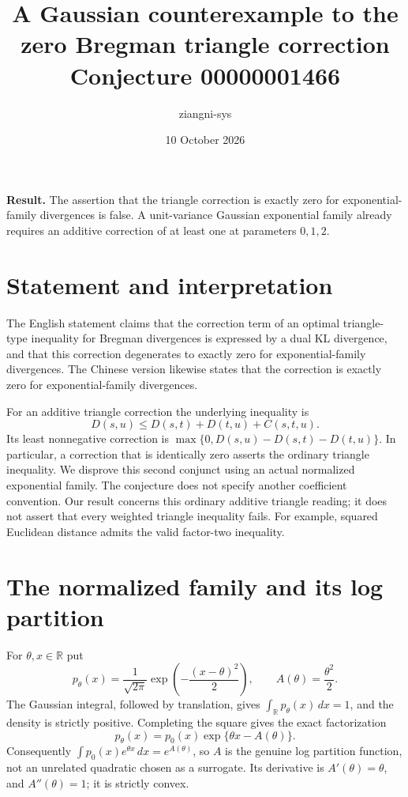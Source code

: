 \documentclass[11pt]{article}
\title{A Gaussian counterexample to the zero Bregman triangle correction\\\large Conjecture 00000001466}
\author{ziangni-sys}
\date{10 October 2026}
\begin{document}
\maketitle
\noindent\textbf{Result.} The assertion that the triangle correction is exactly zero for exponential-family divergences is false. A unit-variance Gaussian exponential family already requires an additive correction of at least one at parameters $0,1,2$.

\section*{Statement and interpretation}
The English statement claims that the correction term of an optimal triangle-type inequality for Bregman divergences is expressed by a dual KL divergence, and that this correction degenerates to exactly zero for exponential-family divergences. The Chinese version likewise states that the correction is exactly zero for exponential-family divergences.

For an additive triangle correction the underlying inequality is
\[
 D(s,u)\le D(s,t)+D(t,u)+C(s,t,u).
\]
Its least nonnegative correction is
$\max\{0,D(s,u)-D(s,t)-D(t,u)\}$. In particular, a correction that is identically zero asserts the ordinary triangle inequality. We disprove this second conjunct using an actual normalized exponential family. The conjecture does not specify another coefficient convention. Our result concerns this ordinary additive triangle reading; it does not assert that every weighted triangle inequality fails. For example, squared Euclidean distance admits the valid factor-two inequality.

\section*{The normalized family and its log partition}
For $\theta,x\in\mathbb R$ put
\[
 p_\theta(x)=\frac{1}{\sqrt{2\pi}}
 \exp\!\left(-\frac{(x-\theta)^2}{2}\right),
 \qquad A(\theta)=\frac{\theta^2}{2}.
\]
The Gaussian integral, followed by translation, gives
$\int_{\mathbb R}p_\theta(x)\,dx=1$, and the density is strictly positive. Completing the square gives the exact factorization
\[
 p_\theta(x)=p_0(x)\exp\{\theta x-A(\theta)\}.
\]
Consequently $\int p_0(x)e^{\theta x}\,dx=e^{A(\theta)}$, so $A$ is the genuine log partition function, not an unrelated quadratic chosen as a surrogate. Its derivative is $A'(\theta)=\theta$, and $A''(\theta)=1$; it is strictly convex.
\end{document}
